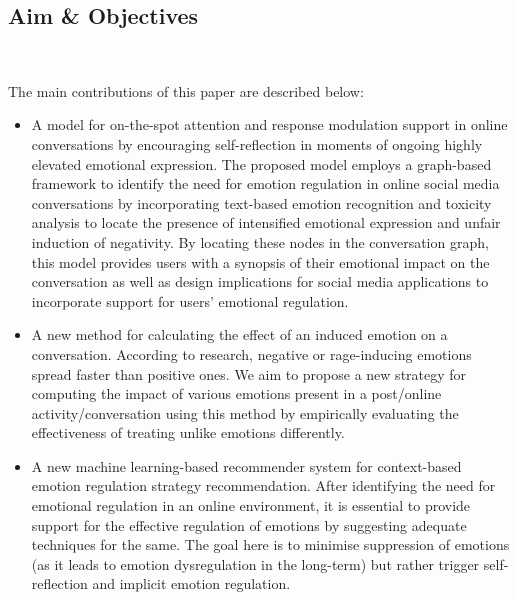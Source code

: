 \subsection{Aim \& Objectives}~\label{subsec:aims}

The main contributions of this paper are described below:
\begin{itemize} 
    \item A model for on-the-spot attention and response modulation support in online conversations by encouraging self-reflection in moments of ongoing highly elevated emotional expression. The proposed model employs a graph-based framework to identify the need for emotion regulation in online social media conversations by incorporating text-based emotion recognition and toxicity analysis to locate the presence of intensified emotional expression and unfair induction of negativity. By locating these nodes in the conversation graph, this model provides users with a synopsis of their emotional impact on the conversation as well as design implications for social media applications to incorporate support for users' emotional regulation.
    \item A new method for calculating the effect of an induced emotion on a conversation. According to research, negative or rage-inducing emotions spread faster than positive ones. We aim to propose a new strategy for computing the impact of various emotions present in a post/online activity/conversation using this method by empirically evaluating the effectiveness of treating unlike emotions differently.
    \item A new machine learning-based recommender system for context-based emotion regulation strategy recommendation. After identifying the need for emotional regulation in an online environment, it is essential to provide support for the effective regulation of emotions by suggesting adequate techniques for the same. The goal here is to minimise suppression of emotions (as it leads to emotion dysregulation in the long-term) but rather trigger self-reflection and implicit emotion regulation.

\end{itemize}

